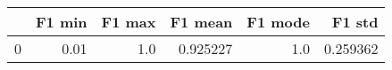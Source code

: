 \begin{tabular}{lrrrrr}
\toprule
{} &  F1 min &  F1 max &   F1 mean &  F1 mode &    F1 std \\
\midrule
0 &    0.01 &     1.0 &  0.925227 &      1.0 &  0.259362 \\
\bottomrule
\end{tabular}
